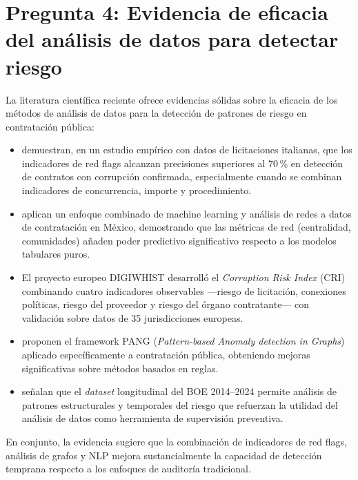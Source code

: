 \documentclass[11pt,a4paper,spanish]{book}
\numberwithin{equation}{chapter}
\numberwithin{figure}{chapter}
\begin{document}
\section{Pregunta 4: Evidencia de eficacia del an{\'a}lisis de datos para detectar riesgo}

La literatura cient{\'i}fica reciente ofrece evidencias s{\'o}lidas sobre la eficacia de los m{\'e}todos de an{\'a}lisis de datos para la detecci{\'o}n de patrones de riesgo en contrataci{\'o}n p{\'u}blica:

\begin{itemize}
  \item {} demuestran, en un estudio emp{\'i}rico con datos de licitaciones italianas, que los indicadores de red flags alcanzan precisiones superiores al 70\,\% en detecci{\'o}n de contratos con corrupci{\'o}n confirmada, especialmente cuando se combinan indicadores de concurrencia, importe y procedimiento.

  \item {} aplican un enfoque combinado de machine learning y an{\'a}lisis de redes a datos de contrataci{\'o}n en M{\'e}xico, demostrando que las m{\'e}tricas de red (centralidad, comunidades) a{\~n}aden poder predictivo significativo respecto a los modelos tabulares puros.

  \item El proyecto europeo DIGIWHIST \cite{Fazekas2020DIGIWHIST,DIGIWHISTProject} desarroll{\'o} el \textit{Corruption Risk Index} (CRI) combinando cuatro indicadores observables ---riesgo de licitaci{\'o}n, conexiones pol{\'i}ticas, riesgo del proveedor y riesgo del {\'o}rgano contratante--- con validaci{\'o}n sobre datos de 35 jurisdicciones europeas.

  \item {} proponen el framework PANG (\textit{Pattern-based Anomaly detection in Graphs}) aplicado espec{\'i}ficamente a contrataci{\'o}n p{\'u}blica, obteniendo mejoras significativas sobre m{\'e}todos basados en reglas.

  \item {} se{\~n}alan que el \textit{dataset} longitudinal del BOE 2014--2024 permite an{\'a}lisis de patrones estructurales y temporales del riesgo que refuerzan la utilidad del an{\'a}lisis de datos como herramienta de supervisi{\'o}n preventiva.
\end{itemize}

En conjunto, la evidencia sugiere que la combinaci{\'o}n de indicadores de red flags, an{\'a}lisis de grafos y NLP mejora sustancialmente la capacidad de detecci{\'o}n temprana respecto a los enfoques de auditor{\'i}a tradicional.
\end{document}
